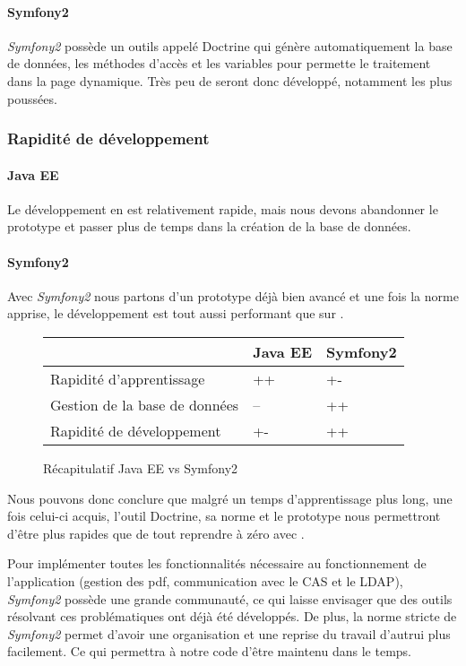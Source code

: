 \paragraph{Symfony2}
\textit{Symfony2} possède un outils appelé Doctrine qui génère automatiquement la base de données, les méthodes d'accès et les variables pour permette le traitement dans la page dynamique. Très peu de seront donc développé, notamment les plus poussées.

\subsubsection{Rapidité de développement}
\paragraph{Java EE}
Le développement en \jee est relativement rapide, mais nous devons abandonner le prototype et passer plus de temps dans la création de la base de données.

\paragraph{Symfony2}
Avec \textit{Symfony2} nous partons d'un prototype déjà bien avancé et une fois la norme apprise, le développement est tout aussi performant que sur \jee.

\begin{figure}[h]
\begin{center}
\begin{tabular}{|m{180pt}|m{50pt}|m{50pt}|}
	\hline
	\null & \textbf{Java EE} & \textbf{Symfony2} \\
	\hline
	Rapidité d'apprentissage & ++ & +-\\
	\hline
	Gestion de la base de données & -- & ++\\
	\hline
	Rapidité de développement & +- & ++ \\
	\hline
\end{tabular} \vspace*{5mm}
\caption{Récapitulatif Java EE vs Symfony2}
\end{center}
\end{figure}
Nous pouvons donc conclure que malgré un temps d'apprentissage plus long, une fois celui-ci acquis, l'outil Doctrine, sa norme et le prototype nous permettront d'être plus rapides que de tout reprendre à zéro avec \jee.

Pour implémenter toutes les fonctionnalités nécessaire au fonctionnement de l'application (gestion des pdf, communication avec le CAS et le LDAP), \textit{Symfony2} possède une grande communauté, ce qui laisse envisager que des outils résolvant ces problématiques ont déjà été développés.
De plus, la norme stricte de \textit{Symfony2} permet d'avoir une organisation et une reprise du travail d'autrui plus facilement. Ce qui permettra à notre code d'être maintenu dans le temps.\\

